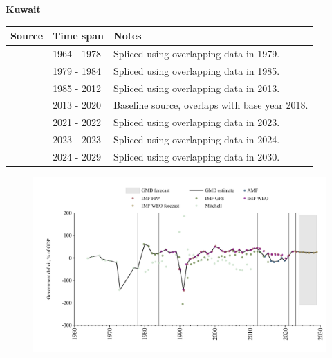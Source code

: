 \documentclass[12pt,a4paper,landscape]{article}
\begin{document}
\begin{adjustbox}{max totalsize={\paperwidth}{\paperheight},center}
\begin{minipage}[t][\textheight][t]{\textwidth}
\vspace*{0.5cm}
{}
\begin{center}
{\Large\bfseries Kuwait}
\end{center}
\vspace{0.5cm}
\begin{table}[H]
\centering
\small
\begin{tabular}{|l|l|l|}
\hline
\textbf{Source} & \textbf{Time span} & \textbf{Notes} \\
\hline
\rowcolor{white}\cite{Mitchell}& 1964 - 1978 &Spliced using overlapping data in 1979.\\
\rowcolor{lightgray}\cite{IMF_GFS}& 1979 - 1984 &Spliced using overlapping data in 1985.\\
\rowcolor{white}\cite{IMF_WEO}& 1985 - 2012 &Spliced using overlapping data in 2013.\\
\rowcolor{lightgray}\cite{AMF}& 2013 - 2020 &Baseline source, overlaps with base year 2018.\\
\rowcolor{white}\cite{IMF_WEO}& 2021 - 2022 &Spliced using overlapping data in 2023.\\
\rowcolor{lightgray}\cite{IMF_FPP}& 2023 - 2023 &Spliced using overlapping data in 2024.\\
\rowcolor{white}\cite{IMF_WEO_forecast}& 2024 - 2029 &Spliced using overlapping data in 2030.\\
\hline
\end{tabular}
\end{table}
\begin{figure}[H]
\centering
\includegraphics[width=\textwidth,height=0.6\textheight,keepaspectratio]{graphs/KWT_govdef_GDP.pdf}
\end{figure}
\end{minipage}
\end{adjustbox}
\end{document}
